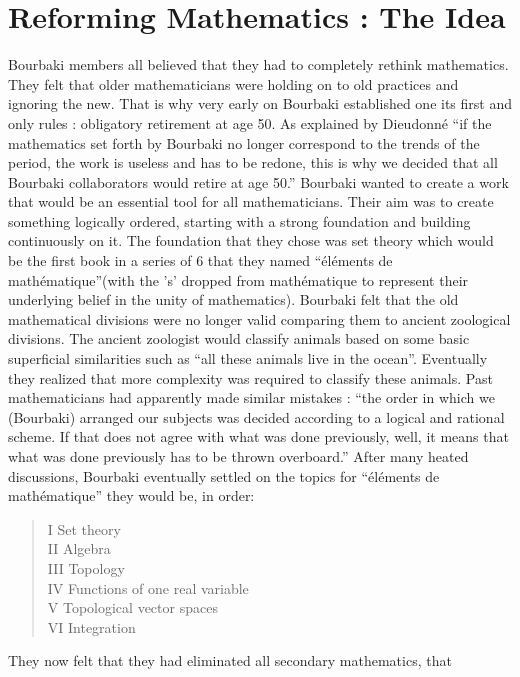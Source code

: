 \documentclass[12pt]{article}
\begin{document}
\section*{Reforming Mathematics : The Idea}\normalsize

Bourbaki members all believed that they had to completely rethink mathematics. 
They felt that older mathematicians were holding on to old practices and 
ignoring the new. That is why very early on Bourbaki established one its 
first and only rules : obligatory retirement at age 50. As explained by 
Dieudonn\'e ``if the mathematics set forth by Bourbaki no longer correspond 
to the trends of the period, the work is useless and has to be redone, this 
is why we decided that all Bourbaki collaborators would retire at age 50.''
\cite{DJ} Bourbaki wanted to create a work that would be an essential tool 
for all mathematicians. Their aim was to create something logically ordered, 
starting with a strong foundation and building continuously on it. The 
foundation that they chose was set theory which would be the first book in a 
series of 6 that they named ``\'el\'ements de math\'ematique''(with the 's' 
dropped from math\'ematique to represent their underlying belief in the unity 
of mathematics). Bourbaki felt that the old mathematical divisions were no 
longer valid comparing them to ancient zoological divisions. The ancient 
zoologist would classify animals based on some basic superficial similarities 
such as ``all these animals live in the ocean''. Eventually they realized that 
more complexity was required to classify these animals. Past mathematicians 
had apparently made similar mistakes : ``the order in which we (Bourbaki) 
arranged our subjects was decided according to a logical and rational scheme. 
If that does not agree with what was done previously, well, it means that 
what was done previously has to be thrown overboard.''\cite{DJ} After many 
heated discussions, Bourbaki eventually settled on the topics for 
``\'el\'ements de math\'ematique'' they would be, in order:
\begin{quote}
I Set theory\\
II Algebra\\
III Topology\\
IV Functions of one real variable\\
V Topological vector spaces\\
VI Integration
\end{quote}
They now felt that they had eliminated all secondary mathematics, that 
\end{document}
